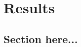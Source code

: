  \let\textcircled=\pgftextcircled
\chapter{Results}
\label{chap:Currprac}

\section{Section here...}

